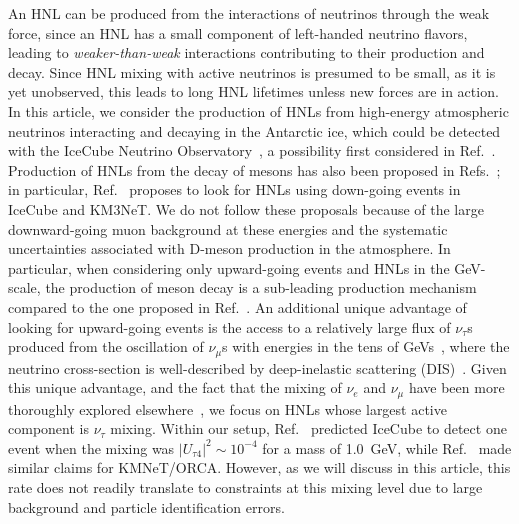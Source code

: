 \documentclass[
    aps,
    prd,
    reprint,
    amsmath,
    amssymb,
    nofootinbib,
    linenumbers,
    superscriptaddress,
    floatfix
]{revtex4-2}
\newcommand{\gev}{\giga\electronvolt}
\def\nomathut4{|U_{\tau4}|^2}
\begin{document}
An HNL can be produced from the interactions of neutrinos through the weak force, since an HNL has a small component of left-handed neutrino flavors, leading to \textit{weaker-than-weak} interactions contributing to their production and decay.
Since HNL mixing with active neutrinos is presumed to be small, as it is yet unobserved, this leads to long HNL lifetimes unless new forces are in action.
In this article, we consider the production of HNLs from high-energy atmospheric neutrinos interacting and decaying in the Antarctic ice, which could be detected with the IceCube Neutrino Observatory~\cite{IceCube:2016zyt}, a possibility first considered in Ref.~\cite{Coloma:2017ppo}.
Production of HNLs from the decay of mesons has also been proposed in Refs.~\cite{Boiarska:2021yho,Coloma:2019htx,Arguelles:2019ziu}; in particular, Ref.~\cite{Boiarska:2021yho} proposes to look for HNLs using down-going events in IceCube and KM3NeT.
We do not follow these proposals because of the large downward-going muon background at these energies and the systematic uncertainties associated with D-meson production in the atmosphere.
In particular, when considering only upward-going events and HNLs in the GeV-scale, the production of meson decay is a sub-leading production mechanism compared to the one proposed in Ref.~\cite{Coloma:2017ppo}.
An additional unique advantage of looking for upward-going events is the access to a relatively large flux of $\nu_\tau$s produced from the oscillation of $\nu_\mu$s with energies in the tens of GeVs~\cite{IceCubeCollaboration:2023wtb}, where the neutrino cross-section is well-described by deep-inelastic scattering (DIS)~\cite{Formaggio:2012cpf}.
Given this unique advantage, and the fact that the mixing of $\nu_e$ and $\nu_\mu$ have been more thoroughly explored elsewhere~\cite{ParticleDataGroup:2024cfk}, we focus on HNLs whose largest active component is $\nu_\tau$ mixing.
Within our setup, Ref.~\cite{Coloma:2017ppo} predicted IceCube to detect one event when the mixing was $\nomathut4\sim10^{-4}$ for a mass of \SI{1.0}{\gev}, while Ref.~\cite{Boiarska:2021yho} made similar claims for KMNeT/ORCA.
However, as we will discuss in this article, this rate does not readily translate to constraints at this mixing level due to large background and particle identification errors. 
\end{document}
